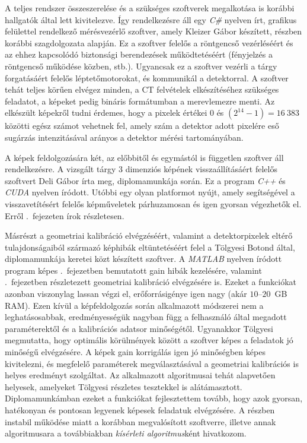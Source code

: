 \documentclass[a4paper,12pt]{article}
\begin{document}
A teljes rendszer összeszerelése és a szükséges szoftverek megalkotása is  korábbi hallgatók által lett kivitelezve. Így rendelkezésre áll egy \emph{C\#} nyelven írt, grafikus felülettel rendelkező mérésvezérlő szoftver, amely Kleizer Gábor készített, részben korábbi szagdolgozata\cite{kleizer} alapján. Ez a szoftver felelős a röntgencső vezérléséért és az ehhez kapcsolódó biztonsági berendezések működtetéséért (fényjelzés a röntgencső működése közben, stb.). Ugyancsak ez a szoftver vezérli a tárgy forgatásáért felelős léptetőmotorokat, és kommunikál a detektorral. A szoftver tehát teljes körűen elvégez minden, a CT felvételek elkészítéséhez szükséges feladatot, a képeket pedig bináris formátumban a merevlemezre menti. Az elkészült képekről tudni érdemes, hogy a pixelek értékei $0$ és $  \left ( 2^{14}-1 \right ) = 16~383$ közötti egész számot vehetnek fel, amely szám a detektor adott pixelére eső sugárzás intenzitásával arányos a detektor mérési tartományában.


A képek feldolgozására két, az előbbitől és egymástól is független szoftver áll rendelkezésre. A vizsgált tárgy 3 dimenziós képének visszaállításáért felelős szoftvert Deli Gábor\cite{deli} írta meg, diplomamunkája során. Ez a program \emph{C++} és \emph{CUDA} nyelven íródott. Utóbbi egy olyan platformot nyújt, amely segítségével a visszavetítésért felelős képműveletek párhuzamosan és igen gyorsan végezhetők el. Erről  .~fejezeten írok részletesen. 


Másrészt a geometriai kalibráció elvégzéséért, valamint a detektorpixelek eltérő tulajdonságaiból származó képhibák eltüntetéséért felel a Tölgyesi Botond által, diplomamunkája \cite{botond} keretei közt készített szoftver. A \emph{MATLAB} nyelven íródott program  képes .~fejezetben bemutatott gain hibák kezelésére, valamint  .~fejezetben részletezett geometriai kalibráció elvégzésére is. Ezeket a funkciókat azonban viszonylag lassan végzi el, erőforrásigénye igen nagy (akár $10$--$20$~GB RAM). Ezen kívül a képfeldolgozás során alkalmazott módszerei nem a leghatásosabbak, eredményességük nagyban függ  a felhasználó által megadott paraméterektől és a kalibrációs adatsor minőségétől. Ugyanakkor Tölgyesi megmutatta, hogy optimális körülmények között a szoftver képes a feladatok jó minőségű elvégzésére. A képek gain korrigálás igen jó minőségben képes kivitelezni, és megfelelő paraméterek megválasztásával a geometriai kalibrációs is helyes eredményt szolgáltat. Az alkalmazott algoritmusai tehát alapvetően helyesek, amelyeket Tölgyesi részletes tesztekkel is alátámasztott. Diplomamunkámban ezeket a  funkciókat fejlesztettem tovább,  hogy azok gyorsan, hatékonyan  és pontosan legyenek képesek feladatuk elvégzésére. A részben instabil működése miatt  a korábban  megvalósított szoftverre, illetve annak algoritmusara a továbbiakban \emph{kísérleti algoritmus}ként hivatkozom.
\end{document}
